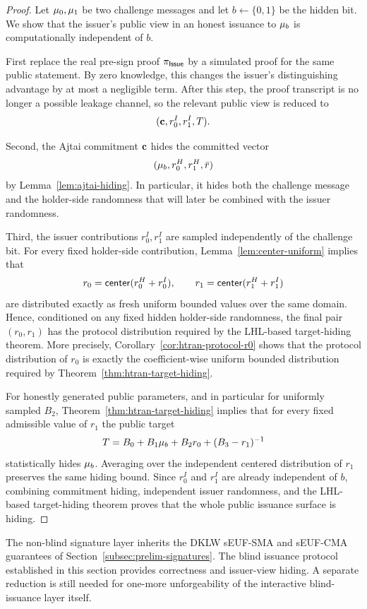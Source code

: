 \begin{proof}
Let $\mathbf{\mu}_0,\mathbf{\mu}_1$ be two challenge messages and let $b\gets\{0,1\}$ be the hidden bit.
We show that the issuer's public view in an honest issuance to $\mathbf{\mu}_b$ is computationally independent of
$b$.

First replace the real pre-sign proof $\pi_{\mathsf{Issue}}$ by a simulated proof for the same public statement.  By zero
knowledge, this changes the issuer's distinguishing advantage by at most a negligible term.  After this step,
the proof transcript is no longer a possible leakage channel, so the relevant public view is reduced to
\[
  (\mathbf{c},r_0^I,r_1^I,T).
\]

Second, the Ajtai commitment $\mathbf{c}$ hides the committed vector
\[
  (\mathbf{\mu}_b,r_0^H,r_1^H,\bar r)
\]
by Lemma~\ref{lem:ajtai-hiding}.  In particular, it hides both the challenge message and the holder-side
randomness that will later be combined with the issuer randomness.

Third, the issuer contributions $r_0^I,r_1^I$ are sampled independently of the challenge bit.  For every fixed
holder-side contribution, Lemma~\ref{lem:center-uniform} implies that
\[
  r_0=\mathsf{center}(r_0^H+r_0^I),
  \qquad
  r_1=\mathsf{center}(r_1^H+r_1^I)
\]
are distributed exactly as fresh uniform bounded values over the same domain.  Hence, conditioned on any
fixed hidden holder-side randomness, the final pair $(r_0,r_1)$ has the protocol distribution required by the
LHL-based target-hiding theorem.  More precisely, Corollary~\ref{cor:htran-protocol-r0} shows that the
protocol distribution of $r_0$ is exactly the coefficient-wise uniform bounded distribution required by
Theorem~\ref{thm:htran-target-hiding}.

For honestly generated public parameters, and in particular for uniformly sampled $B_2$, Theorem~\ref{thm:htran-target-hiding} implies that for every fixed admissible value of $r_1$ the public target
\[
  T=B_0+B_1\mathbf{\mu}_b+B_2r_0+(B_3-r_1)^{-1}
\]
statistically hides $\mathbf{\mu}_b$.  Averaging over the independent centered distribution of $r_1$ preserves the
same hiding bound.  Since $r_0^I$ and $r_1^I$ are already independent of $b$, combining commitment hiding,
independent issuer randomness, and the LHL-based target-hiding theorem proves that the whole public issuance
surface is hiding.
\end{proof}

\begin{remark}\label{rem:bs-security-status}
The non-blind signature layer inherits the DKLW sEUF-SMA and sEUF-CMA guarantees of
Section~\ref{subsec:prelim-signatures}.  The blind issuance protocol established in this section provides
correctness and issuer-view hiding.  A separate reduction is still needed for one-more unforgeability of the
interactive blind-issuance layer itself.
\end{remark}
